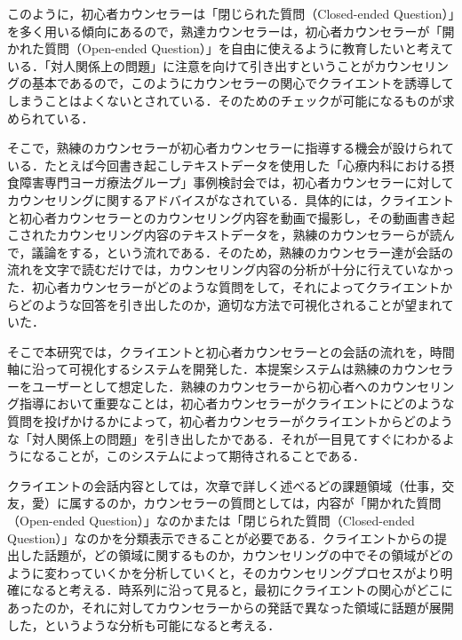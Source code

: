 \documentclass[shuuron]{kuee}
\begin{document}
このように，初心者カウンセラーは「閉じられた質問（Closed-ended Question）」を多く用いる傾向にあるので，熟達カウンセラーは，初心者カウンセラーが「開かれた質問（Open-ended Question）」を自由に使えるように教育したいと考えている．「対人関係上の問題」に注意を向けて引き出すということがカウンセリングの基本であるので，このようにカウンセラーの関心でクライエントを誘導してしまうことはよくないとされている．そのためのチェックが可能になるものが求められている．

そこで，熟練のカウンセラーが初心者カウンセラーに指導する機会が設けられている．たとえば今回書き起こしテキストデータを使用した「心療内科における摂食障害専門ヨーガ療法グループ」事例検討会では，初心者カウンセラーに対してカウンセリングに関するアドバイスがなされている．具体的には，クライエントと初心者カウンセラーとのカウンセリング内容を動画で撮影し，その動画書き起こされたカウンセリング内容のテキストデータを，熟練のカウンセラーらが読んで，議論をする，という流れである．そのため，熟練のカウンセラー達が会話の流れを文字で読むだけでは，カウンセリング内容の分析が十分に行えていなかった．初心者カウンセラーがどのような質問をして，それによってクライエントからどのような回答を引き出したのか，適切な方法で可視化されることが望まれていた．

そこで本研究では，クライエントと初心者カウンセラーとの会話の流れを，時間軸に沿って可視化するシステムを開発した．本提案システムは熟練のカウンセラーをユーザーとして想定した．熟練のカウンセラーから初心者へのカウンセリング指導において重要なことは，初心者カウンセラーがクライエントにどのような質問を投げかけるかによって，初心者カウンセラーがクライエントからどのような「対人関係上の問題」を引き出したかである．それが一目見てすぐにわかるようになることが，このシステムによって期待されることである．%



クライエントの会話内容としては，次章で詳しく述べるどの課題領域（仕事，交友，愛）に属するのか，カウンセラーの質問としては，内容が「開かれた質問（Open-ended Question）」なのかまたは「閉じられた質問（Closed-ended Question）」なのかを分類表示できることが必要である．クライエントからの提出した話題が，どの領域に関するものか，カウンセリングの中でその領域がどのように変わっていくかを分析していくと，そのカウンセリングプロセスがより明確になると考える．時系列に沿って見ると，最初にクライエントの関心がどこにあったのか，それに対してカウンセラーからの発話で異なった領域に話題が展開した，というような分析も可能になると考える．
\end{document}
